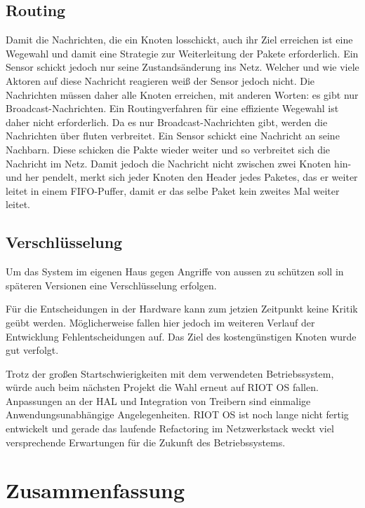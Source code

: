 \documentclass{IEEEtran}
\begin{document}
    \subsection{Routing}
        Damit die Nachrichten, die ein Knoten losschickt, auch ihr Ziel 
        erreichen ist eine Wegewahl und damit eine Strategie zur Weiterleitung 
        der Pakete erforderlich. Ein Sensor schickt jedoch nur seine 
        Zustandsänderung ins Netz. Welcher und wie viele Aktoren auf diese 
        Nachricht reagieren weiß der Sensor jedoch nicht. Die Nachrichten müssen 
        daher alle Knoten erreichen, mit anderen Worten: es gibt nur 
        Broadcast-Nachrichten. Ein Routingverfahren für eine effiziente Wegewahl 
        ist daher nicht erforderlich.
        Da es nur Broadcast-Nachrichten gibt, werden die Nachrichten über fluten 
        verbreitet. Ein Sensor schickt eine Nachricht an seine Nachbarn. Diese 
        schicken die Pakte wieder weiter und so verbreitet sich die Nachricht im 
        Netz. Damit jedoch die Nachricht nicht zwischen zwei Knoten hin- und 
        her pendelt, merkt sich jeder Knoten den Header jedes Paketes, das er 
        weiter leitet in einem FIFO-Puffer, damit er das selbe Paket kein 
        zweites Mal weiter leitet.
        

    \subsection{Verschlüsselung}
    Um das System im eigenen Haus gegen Angriffe von aussen zu schützen soll in 
    späteren Versionen eine Verschlüsselung erfolgen. 





Für die Entscheidungen in der Hardware kann zum jetzien Zeitpunkt keine Kritik geübt werden. Möglicherweise fallen hier jedoch im weiteren Verlauf der Entwicklung Fehlentscheidungen auf. Das Ziel des kostengünstigen Knoten wurde gut verfolgt.

Trotz der großen Startschwierigkeiten mit dem verwendeten Betriebssystem, würde auch beim nächsten Projekt die Wahl erneut auf RIOT OS fallen. Anpassungen an der \ac{HAL} und Integration von Treibern sind einmalige Anwendungsunabhängige Angelegenheiten. RIOT OS ist noch lange nicht fertig entwickelt und gerade das laufende Refactoring im Netzwerkstack weckt viel versprechende Erwartungen für die Zukunft des Betriebssystems.

\section{Zusammenfassung}
\end{document}
